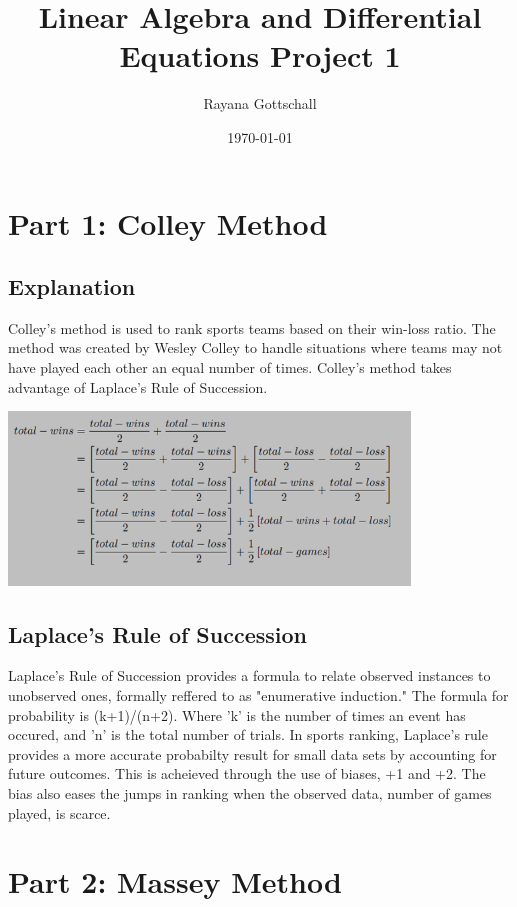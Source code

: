 \documentclass[12pt]{article}
\title{Linear Algebra and Differential Equations Project 1}
\author{Rayana Gottschall}
\date{\today}
\begin{document}
\maketitle
\tableofcontents
\newpage

\section{Part 1: Colley Method}
\subsection{Explanation}
Colley's method is used to rank sports teams based on their win-loss ratio.
The method was created by Wesley Colley to handle situations where teams may 
not have played each other an equal number of times. Colley's method takes advantage
of Laplace's Rule of Succession.
\begin{center}
\includegraphics[width=0.8\textwidth]{colleysmethod.png}
\end{center}

\subsection{Laplace's Rule of Succession}
Laplace's Rule of Succession provides a formula to relate observed 
instances to unobserved ones, formally reffered to as "enumerative induction." 
The formula for probability is (k+1)/(n+2). Where 'k' is the number of times an 
event has occured, and 'n' is the total number of trials. 
In sports ranking, Laplace's rule provides a more accurate probabilty result for small data
 sets by accounting for future outcomes. 
This is acheieved through the use of biases, +1 and +2. 
The bias also eases the jumps in ranking when the observed data, number of games played, is
 scarce.


\section{Part 2: Massey Method}
\end{document}
